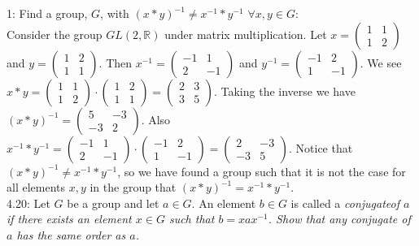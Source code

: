 \documentclass{scrartcl}
\begin{document}
1: Find a group, $G$, with $(x*y)^{-1} \ne x^{-1}*y^{-1} $ $ \forall x,y \in G$:\\

Consider the group $GL(2,\mathbb{R})$ under matrix multiplication. Let $x=\begin{pmatrix} 1 & 1 \\ 1 & 2 \end{pmatrix}$ and $y=\begin{pmatrix} 1 & 2 \\ 1 & 1 \end{pmatrix}$. Then $x^{-1}=\begin{pmatrix} -1 & 1 \\ 2 & -1 \end{pmatrix}$ and $y^{-1}=\begin{pmatrix} -1 & 2 \\ 1 & -1\end{pmatrix}$. We see $x*y=\begin{pmatrix} 1 & 1 \\ 1 & 2 \end{pmatrix}\cdot\begin{pmatrix} 1 & 2 \\ 1 & 1 \end{pmatrix}=\begin{pmatrix} 2 & 3 \\ 3 & 5 \end{pmatrix}$. Taking the inverse we have $(x*y)^{-1}=\begin{pmatrix} 5 & -3 \\ -3 & 2 \end{pmatrix}$. Also $x^{-1}*y^{-1}=\begin{pmatrix} -1 & 1 \\ 2 & -1 \end{pmatrix}\cdot\begin{pmatrix} -1 & 2 \\ 1 & -1\end{pmatrix}=\begin{pmatrix} 2 & -3 \\ -3 & 5 \end{pmatrix}$. Notice that $(x*y)^{-1} \ne x^{-1} * y^{-1}$, so we have found a group such that it is not the case for all elements $x,y$ in the group that $(x*y)^{-1}=x^{-1} * y^{-1}$. \\

4.20: Let $G$ be a group and let $a \in G$. An element $b \in G$ is called a \em conjugate\em of $a$ if there exists an element $x \in G$ such that $b=xax^{-1}$. Show that any conjugate of $a$ has the same order as $a$.\\
\end{document}
